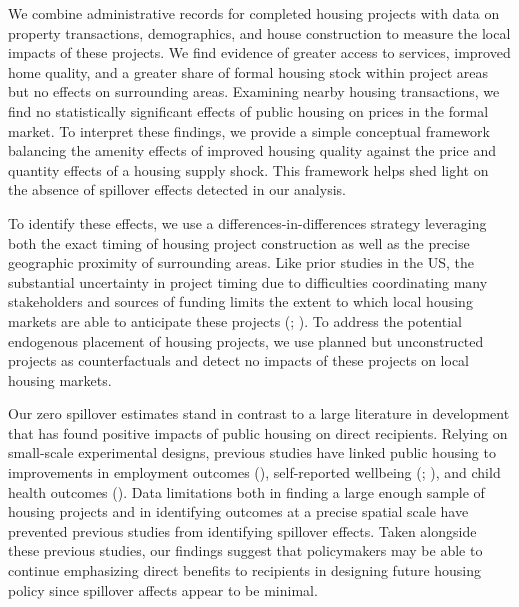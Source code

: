 \documentclass[12pt]{article}
\begin{document}
We combine administrative records for completed housing projects with data on property transactions, demographics, and house construction to measure the local impacts of these projects.   We find evidence of greater access to services, improved home quality, and a greater share of formal housing stock within project areas but no effects on surrounding areas.  Examining nearby housing transactions, we find no statistically significant effects of public housing on prices in the formal market.  To interpret these findings, we provide a simple conceptual framework balancing the amenity effects of improved housing quality against the price and quantity effects of a housing supply shock.  This framework helps shed light on the absence of spillover effects detected in our analysis.


To identify these effects, we use a differences-in-differences strategy leveraging both the exact timing of housing project construction as well as the precise geographic proximity of surrounding areas.  Like prior studies in the US, the substantial uncertainty in project timing due to difficulties coordinating many stakeholders and sources of funding limits the extent to which local housing markets are able to anticipate these projects (\cite{diamond2016wants}; \cite{serihistory}).  To address the potential endogenous placement of housing projects, we use planned but unconstructed projects as counterfactuals and detect no impacts of these projects on local housing markets.

Our zero spillover estimates stand in contrast to a large literature in development that has found positive impacts of public housing on direct recipients.  Relying on small-scale experimental designs, previous studies have linked public housing to improvements in employment outcomes (\cite{franklin2016enabled}), self-reported wellbeing (\cite{galiani2017shelter}; \cite{devoto2012happiness}), and child health outcomes (\cite{cattaneo2009housing}).  Data limitations both in finding a large enough sample of housing projects and in identifying outcomes at a precise spatial scale have prevented previous studies from identifying spillover effects.  Taken alongside these previous studies, our findings suggest that policymakers may be able to continue emphasizing direct benefits to recipients in designing future housing policy since spillover affects appear to be minimal.
\end{document}
